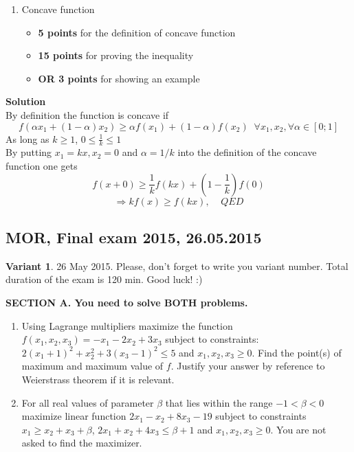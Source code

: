 \begin{enumerate}
\item Concave function
\begin{itemize}
    \item \textbf{5 points} for the definition of concave function
    \item \textbf{15 points} for proving the inequality
    \item \textbf{OR 3 points} for showing an example
\end{itemize}
\end{enumerate}

\textbf{Solution} \\
By definition the function is concave if
\[
f(\alpha x_1+(1-\alpha) x_2) \geq \alpha f(x_1)+(1-\alpha) f(x_2) \;\; \forall x_1,x_2, \forall \alpha \in [0;1]
\]
As long as $k\geq 1$, $0\leq \frac 1 k \leq 1$\\
By putting $x_1=kx, x_2=0$ and $\alpha = 1/k$ into the definition of the concave function one gets
\[
f(x + 0) \geq \frac 1 k f(kx) +(1-\frac 1 k) f(0)
\]
\[
\Longrightarrow kf(x) \geq f(kx), \;\;\;\; QED
\]


\subsection{MOR, Final exam 2015, 26.05.2015}

\textbf{Variant 1}. 26 May 2015. Please, don't forget to write you variant number. Total duration of the exam is 120 min. Good luck! :)

\vspace{0.6cm}

\textbf{SECTION A. You need to solve BOTH problems.}

\begin{enumerate}

\item Using Lagrange multipliers maximize  the function $f(x_1,x_2,x_3)=-x_1-2x_2+3x_3$ subject to constraints:   $2(x_1+1)^2+x_2^2+3(x_3-1)^2\leq 5$ and $x_1, x_2, x_3 \geq 0$. Find the point(s) of maximum and maximum value of $f$. Justify your answer by reference to Weierstrass theorem if it is relevant.

\item For all real values of parameter $\beta$ that lies within the range $-1<\beta<0$ maximize linear function $2x_1-x_2+8x_3-19$ subject to constraints  $x_1\geq x_2+x_3+\beta$,  $2x_1+x_2+4x_3\leq \beta+1$ and $x_1, x_2, x_3 \geq 0$. You are not asked to find the maximizer.

\end{enumerate}


